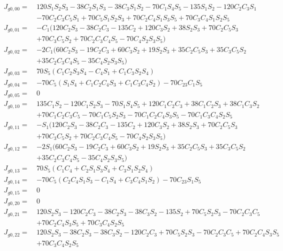 \begin{equation*}
\begin{split}
J_{g0,00} =\  &120S_1S_2S_3 - 38C_2S_1S_3 - 38C_3S_1S_2 - 70C_1S_4S_5 - 135S_1S_2 - 120C_2C_3S_1\\
         	  &- 70C_2C_3C_5S_1 + 70C_5S_1S_2S_3  + 70C_2C_4S_1S_3S_5 + 70C_3C_4S_1S_2S_5\\
J_{g0,01} =\  &-C_1(120C_2S_3 - 38C_2C_3 - 135C_2 + 120C_3S_2 + 38S_2S_3 + 70C_2C_5S_3 \\
         	  &+ 70C_3C_5S_2 + 70C_2C_3C_4S_5 - 70C_4S_2S_3S_5)\\
J_{g0,02} =\  &-2C_1(60C_2S_3 - 19C_2C_3 + 60C_3S_2 + 19S_2S_3 + 35C_2C_5S_3 + 35C_3C_5S_2\\ 
         	  &+ 35C_2C_3C_4S_5 - 35C_4S_2S_3S_5)\\
J_{g0,03} =\  &70S_5(C_1C_2S_3S_4 - C_4S_1 + C_1C_3S_2S_4)\\
J_{g0,04} =\  &- 70C_5(S_1S_4 + C_1C_2C_4S_3 + C_1C_3C_4S_2) - 70C_{23}C_1S_5\\
J_{g0,05} =\  &0\\
J_{g0,10} =\  &135C_1S_2 - 120C_1S_2S_3 - 70S_1S_4S_5 + 120C_1C_2C_3 + 38C_1C_2S_3 + 38C_1C_3S_2 \\
		 	  &+ 70C_1C_2C_3C_5 - 70C_1C_5S_2S_3 - 70C_1C_2C_4S_3S_5 - 70C_1C_3C_4S_2S_5\\
J_{g0,11} =\  &-S_1(120C_2S_3 - 38C_2C_3 - 135C_2 + 120C_3S_2 + 38S_2S_3 + 70C_2C_5S_3\\
		   	  &+ 70C_3C_5S_2 + 70C_2C_3C_4S_5 - 70C_4S_2S_3S_5)\\
J_{g0,12} =\  &-2S_1(60C_2S_3 - 19C_2C_3 + 60C_3S_2 + 19S_2S_3 + 35C_2C_5S_3 + 35C_3C_5S_2 \\ 
		 	  &+ 35C_2C_3C_4S_5 - 35C_4S_2S_3S_5)\\
J_{g0,13} =\  &70S_5(C_1C_4 + C_2S_1S_3S_4 + C_3S_1S_2S_4)\\
J_{g0,14} =\  &- 70C_5(C_2C_4S_1S_3 - C_1S_4 + C_3C_4S_1S_2) - 70C_{23}S_1S_5\\
J_{g0,15} =\  &0\\
J_{g0,20} =\  &0\\
J_{g0,21} =\  &120S_2S_3 - 120C_2C_3 - 38C_2S_3 - 38C_3S_2 - 135S_2 + 70C_5S_2S_3 - 70C_2C_3C_5\\
		 	  &+ 70C_2C_4S_3S_5 + 70C_3C_4S_2S_5\\
J_{g0,22} =\  &120S_2S_3 - 38C_2S_3 - 38C_3S_2 - 120C_2C_3 + 70C_5S_2S_3 - 70C_2C_3C_5 + 70C_2C_4S_3S_5\\
		 	  &+ 70C_3C_4S_2S_5\\

\end{split}
\end{equation*}
